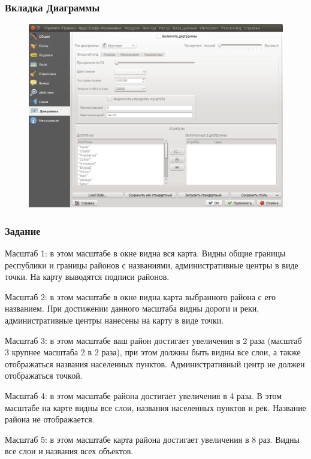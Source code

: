\begin{frame}
    \frametitle{Вкладка Диаграммы}
    \begin{figure}[!ht]
           \begin{center}
               \includegraphics[width=0.95\columnwidth]{./practic/img/diagrams.png}
           \end{center}
       \end{figure}
\end{frame}

\begin{frame}
    \frametitle{Задание}
    Масштаб 1: в этом масштабе в окне видна вся карта. Видны общие границы республики и границы районов с названиями, административные центры в виде точки. На карту выводятся подписи районов.

    Масштаб 2: в этом масштабе в окне видна карта выбранного района с его названием. При достижении данного масштаба видны дороги и реки, административные центры нанесены на карту в виде точки.

    Масштаб 3: в этом масштабе ваш район достигает увеличения в 2 раза  (масштаб 3 крупнее масштаба 2 в 2 раза), при этом должны быть видны все слои, а также отображаться названия населенных пунктов. Административный центр не должен отображаться точкой.

    Масштаб 4: в этом масштабе района достигает увеличения в 4 раза. В этом масштабе на карте видны все слои, названия населенных пунктов и рек. Название района не отображается.

    Масштаб 5: в этом масштабе карта района достигает увеличения в 8 раз. Видны все слои и названия всех объектов.
\end{frame}


